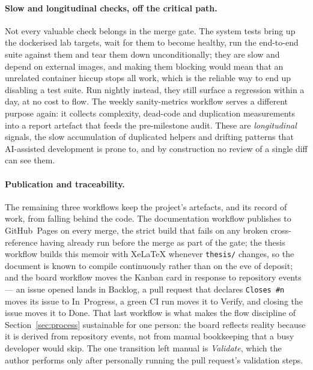 \paragraph{Slow and longitudinal checks, off the critical path.} Not every valuable
check belongs in the merge gate. The system tests bring up the dockerised lab
targets, wait for them to become healthy, run the end-to-end suite against them and
tear them down unconditionally; they are slow and depend on external images, and
making them blocking would mean that an unrelated container hiccup stops all work,
which is the reliable way to end up disabling a test suite. Run nightly instead, they still
surface a regression within a day, at no cost to flow. The weekly sanity-metrics
workflow serves a different purpose again: it collects complexity, dead-code and
duplication measurements into a report artefact that feeds the pre-milestone audit.
These are \emph{longitudinal} signals, the slow accumulation of duplicated helpers
and drifting patterns that AI-assisted development is prone to, and by
construction no review of a single diff can see them.

\paragraph{Publication and traceability.} The remaining three workflows keep the
project's artefacts, and its record of work, from falling behind the code. The
documentation workflow publishes to GitHub~Pages on every merge, the strict build
that fails on any broken cross-reference having already run before the merge as part
of the gate; the thesis workflow builds this memoir with XeLaTeX whenever
\texttt{thesis/} changes, so the document is known to compile continuously rather than
on the eve of deposit; and the board workflow moves the Kanban card in response to
repository events --- an issue opened lands in Backlog, a pull request that declares
\texttt{Closes~\#n} moves its issue to In~Progress, a green CI run moves it to Verify,
and closing the issue moves it to Done. That last workflow is what makes the flow
discipline of Section~\ref{sec:process} sustainable for one person: the board reflects
reality because it is derived from repository events, not from manual bookkeeping that
a busy developer would skip. The one transition left manual is \emph{Validate}, which
the author performs only after personally running the pull request's validation steps.

